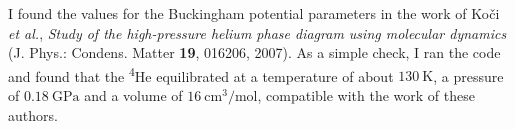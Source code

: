 I found the values for the Buckingham potential parameters in the work of 
Ko\v{c}i \textit{et al.}, \textit{Study of the high-pressure helium phase 
diagram using molecular dynamics} (J. Phys.: Condens. Matter \textbf{19}, 
016206, 2007). As a simple check, I ran the code and found that the 
\textsuperscript{4}He equilibrated at a temperature of about $130\ \mathrm{K}$, 
a pressure of $0.18\ \mathrm{GPa}$ and a volume of $16\ 
\mathrm{cm}^3/\mathrm{mol}$, compatible with the work of these authors.

